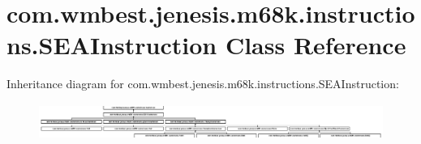 \hypertarget{classcom_1_1wmbest_1_1jenesis_1_1m68k_1_1instructions_1_1SEAInstruction}{\section{com.\-wmbest.\-jenesis.\-m68k.\-instructions.\-S\-E\-A\-Instruction Class Reference}
\label{classcom_1_1wmbest_1_1jenesis_1_1m68k_1_1instructions_1_1SEAInstruction}
}
Inheritance diagram for com.\-wmbest.\-jenesis.\-m68k.\-instructions.\-S\-E\-A\-Instruction\-:\begin{figure}[H]
\begin{center}
\leavevmode
\includegraphics[height=1.193521cm]{classcom_1_1wmbest_1_1jenesis_1_1m68k_1_1instructions_1_1SEAInstruction}
\end{center}
\end{figure}

